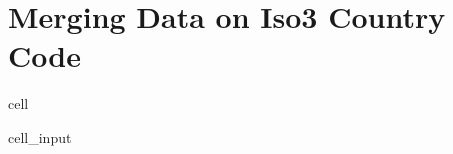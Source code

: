 \documentclass[letterpaper,10pt,english]{jupyterBook}
\begin{document}
\section{Merging Data on Iso3 Country Code}
\label{\detokenize{notebooks/replicating_paper:merging-data-on-iso3-country-code}}
\begin{sphinxuseclass}{cell}\begin{sphinxVerbatimInput}

\begin{sphinxuseclass}{cell_input}
\begin{sphinxVerbatim}[commandchars=\\\{\}]
     
\end{sphinxVerbatim}

\end{sphinxuseclass}\end{sphinxVerbatimInput}

\end{sphinxuseclass}
\end{document}
